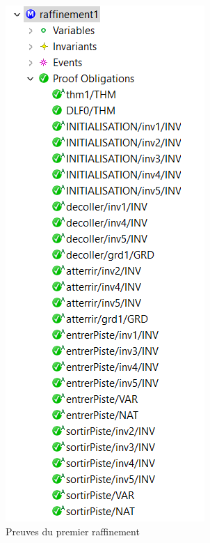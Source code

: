  \begin{figure}[H]
 	\begin{center}	
 		\includegraphics[scale=1.5]{images/1/proof1}
 		\caption{Preuves du premier raffinement}
 		\label{proof1}
 	\end{center}
 \end{figure}
 

